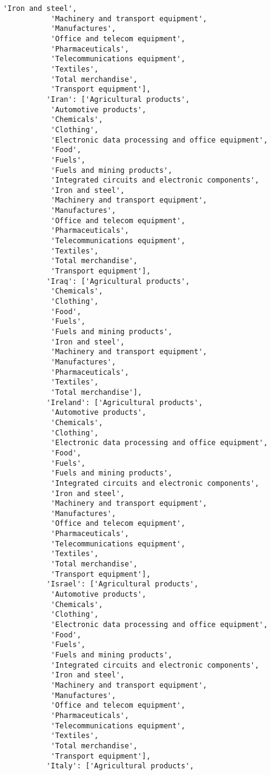 \documentclass[11pt]{article}
\begin{document}
\begin{Verbatim}[commandchars=\\\{\}]
           'Iron and steel',
           'Machinery and transport equipment',
           'Manufactures',
           'Office and telecom equipment',
           'Pharmaceuticals',
           'Telecommunications equipment',
           'Textiles',
           'Total merchandise',
           'Transport equipment'],
          'Iran': ['Agricultural products',
           'Automotive products',
           'Chemicals',
           'Clothing',
           'Electronic data processing and office equipment',
           'Food',
           'Fuels',
           'Fuels and mining products',
           'Integrated circuits and electronic components',
           'Iron and steel',
           'Machinery and transport equipment',
           'Manufactures',
           'Office and telecom equipment',
           'Pharmaceuticals',
           'Telecommunications equipment',
           'Textiles',
           'Total merchandise',
           'Transport equipment'],
          'Iraq': ['Agricultural products',
           'Chemicals',
           'Clothing',
           'Food',
           'Fuels',
           'Fuels and mining products',
           'Iron and steel',
           'Machinery and transport equipment',
           'Manufactures',
           'Pharmaceuticals',
           'Textiles',
           'Total merchandise'],
          'Ireland': ['Agricultural products',
           'Automotive products',
           'Chemicals',
           'Clothing',
           'Electronic data processing and office equipment',
           'Food',
           'Fuels',
           'Fuels and mining products',
           'Integrated circuits and electronic components',
           'Iron and steel',
           'Machinery and transport equipment',
           'Manufactures',
           'Office and telecom equipment',
           'Pharmaceuticals',
           'Telecommunications equipment',
           'Textiles',
           'Total merchandise',
           'Transport equipment'],
          'Israel': ['Agricultural products',
           'Automotive products',
           'Chemicals',
           'Clothing',
           'Electronic data processing and office equipment',
           'Food',
           'Fuels',
           'Fuels and mining products',
           'Integrated circuits and electronic components',
           'Iron and steel',
           'Machinery and transport equipment',
           'Manufactures',
           'Office and telecom equipment',
           'Pharmaceuticals',
           'Telecommunications equipment',
           'Textiles',
           'Total merchandise',
           'Transport equipment'],
          'Italy': ['Agricultural products',

\end{Verbatim}
\end{document}
